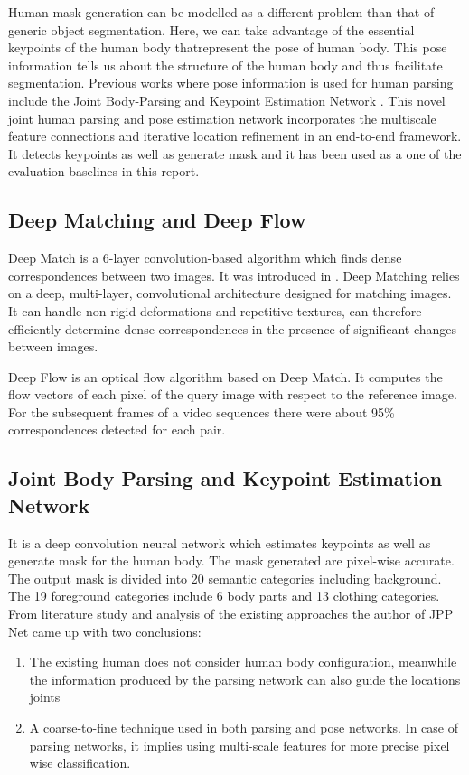 \documentclass[conference]{IEEEtran}
\begin{document}
Human mask generation can be modelled as a different problem than that of generic object segmentation. Here, we can take advantage of the essential keypoints of the human body thatrepresent the pose of human body. This pose information tells us about the structure of the human body and thus facilitate segmentation. Previous works where pose information is used for human parsing include the Joint Body-Parsing and Keypoint Estimation Network \cite{jppNet}. This novel joint human parsing and pose estimation network incorporates the multiscale feature connections and iterative location refinement in an end-to-end framework. It detects keypoints as well as generate mask and it has been used as a one of the evaluation baselines in this report. 
 
\subsection{Deep Matching and Deep Flow} \label{DM}

Deep Match is a 6-layer convolution-based algorithm which finds dense correspondences between two images. It was introduced in \cite{deepmatch}. Deep Matching relies on a deep, multi-layer, convolutional architecture designed for matching images. It can handle non-rigid deformations and repetitive textures, can therefore efficiently determine dense correspondences in the presence of significant changes between images.

Deep Flow is an optical flow algorithm based on Deep Match. It computes the flow vectors of each pixel of the query image with respect to the reference image. For the subsequent frames of a video sequences there were about 95\% correspondences detected for each pair.

\subsection{Joint Body Parsing and Keypoint Estimation Network} \label{jpp}
It is a deep convolution neural network which estimates keypoints as well as generate mask for the human body. The mask generated are pixel-wise accurate. The output mask is divided into 20 semantic categories including background. The 19 foreground categories include 6 body parts and 13 clothing categories. From literature study and analysis of the existing approaches the author of JPP Net came up with two conclusions:
\begin{enumerate}
  \item The existing human does not consider human body configuration, meanwhile the information produced by the parsing network can also guide the locations joints
   \item A coarse-to-fine technique used in both parsing and pose networks. In case of parsing networks, it implies using multi-scale features for more precise pixel wise classification.
\end{enumerate} 
\end{document}
